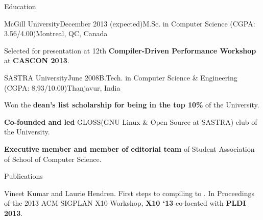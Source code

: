 \documentclass{resume} %
\begin{document}
 \begin{rSection}{Education}

\begin{rSubsection}{McGill University}{December 2013 (expected)}{M.Sc. in Computer Science (CGPA: 3.56/4.00)}{Montreal, QC, Canada}
\item Selected for presentation at 12th \textbf{Compiler-Driven Performance Workshop} at \textbf{CASCON 2013}.
\end{rSubsection}
\begin{rSubsection}{SASTRA University}{June 2008}{B.Tech. in Computer Science \& Engineering (CGPA: 8.93/10.00)}{Thanjavur, India}
\item Won the  \textbf{dean's list scholarship for being in the top 10\% }of the University. 
\item \textbf{Co-founded and led} GLOSS(GNU Linux \& Open Source at SASTRA) club of the University.
\item \textbf{Executive member and member of editorial team} of Student Association of School of Computer Science. 
\end{rSubsection}

\end{rSection}


\begin{rSection}{Publications}
\smallskip
\begin{lSubsection}
\item Vineet Kumar and Laurie Hendren. First steps to compiling \matlab to \xten. In Proceedings of the 2013 ACM SIGPLAN X10 Workshop, \textbf{X10 `13} co-located with \textbf{PLDI 2013}.
\end{lSubsection}
\end{rSection}
\end{document}
